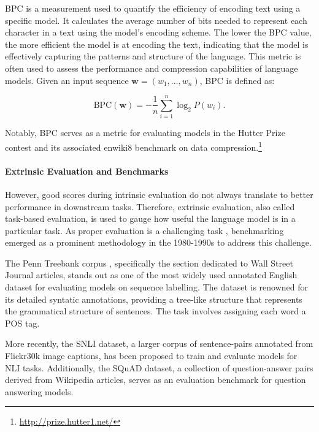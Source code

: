 \ac{BPC} is a measurement used to quantify the efficiency of encoding text using a specific model. It calculates the average number of bits needed to represent each character in a text using the model's encoding scheme. The lower the \ac{BPC} value, the more efficient the model is at encoding the text, indicating that the model is effectively capturing the patterns and structure of the language. This metric is often used to assess the performance and compression capabilities of language models. Given an input sequence $\bm{w} = (w_1, \ldots, w_n)$, \ac{BPC} is defined as:

\begin{equation}
    \text{BPC}(\bm{w}) = - \dfrac{1}{n} \sum_{i=1}^n \log_2 P(w_i).
\end{equation}

\noindent Notably, \ac{BPC} serves as a metric for evaluating models in the Hutter Prize contest and its associated enwiki8 benchmark on data compression.\footnote{\url{http://prize.hutter1.net/}}

\paragraph{Extrinsic Evaluation and Benchmarks} However, good scores during intrinsic evaluation do not always translate to better performance in downstream tasks. Therefore, extrinsic evaluation, also called task-based evaluation, is used to gauge how useful the language model is in a particular task. As proper evaluation is a challenging task \citep{jones2005some}, benchmarking emerged as a prominent methodology in the 1980-1990s to address this challenge. 

The Penn Treebank corpus \citep{marcus1993building}, specifically the section dedicated to Wall Street Journal articles, stands out as one of the most widely used annotated English dataset for evaluating models on sequence labelling. The dataset is renowned for its detailed syntatic annotations, providing a tree-like structure that represents the grammatical structure of sentences. The task involves assigning each word a \ac{POS} tag. 

More recently, the \ac{SNLI} dataset, a larger corpus of sentence-pairs annotated from Flickr30k image captions, has been proposed to train and evaluate models for \ac{NLI} tasks. Additionally, the \ac{SQuAD} \citep{rajpurkar2016squad} dataset, a collection of question-answer pairs derived from Wikipedia articles, serves as an evaluation benchmark for question answering models. 

